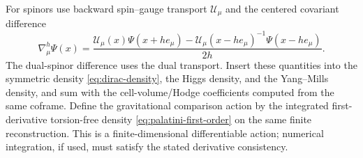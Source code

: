 \documentclass[11pt]{article}
\numberwithin{equation}{section}
\theoremstyle{definition}
\theoremstyle{remark}
\begin{document}
For spinors use backward spin--gauge transport $\mathcal U_\mu$ and the centered covariant difference
\begin{equation}
 \nabla^h_\mu\Psi(x)=\frac{
 \mathcal U_\mu(x)\Psi(x+h e_\mu)
 -\mathcal U_\mu(x-h e_\mu)^{-1}\Psi(x-h e_\mu)}{2h}.
 \label{eq:spin-difference}
\end{equation}
The dual-spinor difference uses the dual transport. Insert these quantities into the symmetric density \eqref{eq:dirac-density}, the Higgs density, and the Yang--Mills density, and sum with the cell-volume/Hodge coefficients computed from the same coframe. Define the gravitational comparison action by the integrated first-derivative torsion-free density \eqref{eq:palatini-first-order} on the same finite reconstruction. This is a finite-dimensional differentiable action; numerical integration, if used, must satisfy the stated derivative consistency.
\end{document}
